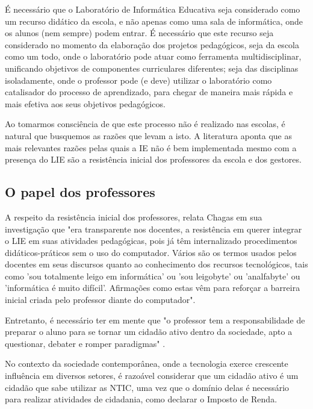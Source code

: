 É necessário que o Laboratório de Informática Educativa seja considerado como um recurso didático da escola, e não apenas como uma sala de informática, onde os alunos (nem sempre) podem entrar. É necessário que este recurso seja considerado no momento da elaboração dos projetos pedagógicos, seja da escola como um todo, onde o laboratório pode atuar como ferramenta multidisciplinar, unificando objetivos de componentes curriculares diferentes; seja das disciplinas isoladamente, onde o professor pode (e deve) utilizar o laboratório como catalisador do processo de aprendizado, para chegar de maneira mais rápida e mais efetiva aos seus objetivos pedagógicos.

Ao tomarmos consciência de que este processo não é realizado nas escolas, é natural que busquemos as razões que levam a isto. A literatura aponta que as mais relevantes razões pelas quais a IE não é bem implementada mesmo com a presença do LIE são a resistência inicial dos professores da escola e dos gestores.

\subsection{O papel dos professores}\label{sec:LABEL_CHP_REF_TEO_SEC_RES_PROF}

A respeito da resistência inicial dos professores, relata Chagas \cite{art:REF_ART_CHAGAS} em sua investigação que "era transparente nos docentes, a resistência em querer integrar o LIE em suas atividades pedagógicas, pois já têm internalizado procedimentos didáticos-práticos sem o uso do computador. Vários são os termos usados pelos docentes em seus discursos quanto ao conhecimento dos recursos tecnológicos, tais como 'sou totalmente leigo em informática' ou 'sou leigobyte' ou 'analfabyte' ou 'informática é muito difícil'. Afirmações como estas vêm para reforçar a barreira inicial criada pelo professor diante do computador".

Entretanto, é necessário ter em mente que "o professor tem a responsabilidade de preparar o aluno para se tornar um cidadão ativo dentro da sociedade, apto a questionar, debater e romper paradigmas" \cite{art:REF_ART_OLIVEIRA}.

No contexto da sociedade contemporânea, onde a tecnologia exerce crescente influência em diversos setores, é razoável considerar que um cidadão ativo é um cidadão que sabe utilizar as NTIC, uma vez que o domínio delas é necessário para realizar atividades de cidadania, como declarar o Imposto de Renda. %

